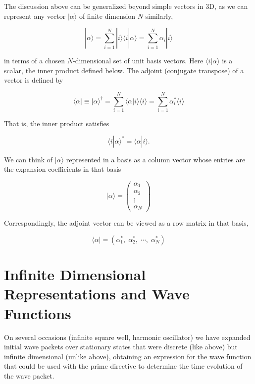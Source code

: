 The discussion above can be generalized beyond simple vectors in 3D, as we can
represent any vector $|\alpha\rangle$ of finite dimension $N$ similarly, 

\[
| \alpha \rangle = \sum_{i=1}^{N} | i \rangle \langle i  | \alpha \rangle
= \sum_{i=1}^{N} \alpha_i |i\rangle
\] \vspace{3px}
 
in terms of a chosen $N$-dimensional set of unit basis vectors. Here $\langle
i | \alpha \rangle$ is a scalar, the inner product defined below. The adjoint
(conjugate transpose) of a vector is defined by 

\[
\langle \alpha | \equiv | \alpha \rangle^\dagger = \sum_{i=1}^{N} \langle
\alpha | i \rangle \langle i \rangle = \sum_{i=1}^{N}  \alpha_i^* \langle
i\rangle 
\] \vspace{3px}

That is, the inner product satisfies 

\[
\langle i | \alpha \rangle^* = \langle \alpha | i \rangle. 
\] \vspace{3px}


We can think of $| \alpha \rangle$ represented in a basis as a column vector
whose entries are the expansion coefficients in that basis

\[
| \alpha  \rangle = \begin{pmatrix}
  \alpha_1 \\ \alpha_2 \\ \vdots \\ \alpha_N
\end{pmatrix}
\] \vspace{3px}

Correspondingly, the adjoint vector can be viewed as a row matrix in that
basis, 

\[
\langle \alpha | = (\alpha_1^*, \; \alpha_2^*, \; \cdots, \; \alpha_N^* )
\] \vspace{3px}

\section{Infinite Dimensional Representations and Wave Functions}

On several occasions (infinite square well, harmonic oscillator) we have
expanded initial wave packets over stationary states that were discrete (like
above) but infinite dimensional (unlike above), obtaining an expression for the
wave function that could be used with the prime directive to determine the time
evolution of the wave packet. 

